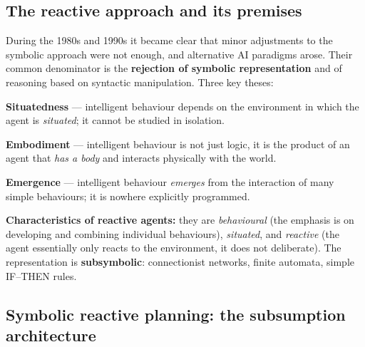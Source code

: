 \documentclass[11pt,a4paper]{article}
\theoremstyle{definition}
\begin{document}
\subsection{The reactive approach and its premises}

During the 1980s and 1990s it became clear that minor adjustments to the symbolic approach were not
enough, and alternative AI paradigms arose. Their common denominator is the \textbf{rejection of
symbolic representation} and of reasoning based on syntactic manipulation. Three key theses:

\begin{defbox}
\textbf{Situatedness} --- intelligent behaviour depends on the environment in which the agent is
\emph{situated}; it cannot be studied in isolation.

\textbf{Embodiment} --- intelligent behaviour is not just logic, it is the product of an agent that
\emph{has a body} and interacts physically with the world.

\textbf{Emergence} --- intelligent behaviour \emph{emerges} from the interaction of many simple
behaviours; it is nowhere explicitly programmed.
\end{defbox}

\textbf{Characteristics of reactive agents:} they are \emph{behavioural} (the emphasis is on
developing and combining individual behaviours), \emph{situated}, and \emph{reactive} (the agent
essentially only reacts to the environment, it does not deliberate). The representation is
\textbf{subsymbolic}: connectionist networks, finite automata, simple IF--THEN rules.

\subsection{Symbolic reactive planning: the subsumption architecture}
\label{ssec:subsumpce}
\end{document}
